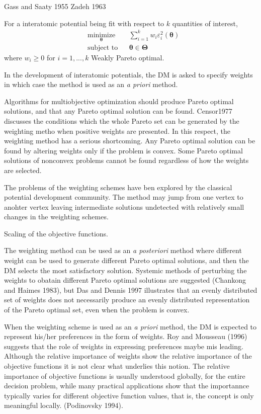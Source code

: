 Gass and Saaty 1955
Zadeh 1963

For a interatomic potential being fit with respect to $k$ quantities of interest,
\begin{equation}
  \begin{aligned}
  & \underset{\bm{\theta}}{\text{minimize}}
        & & \sum_{i=1}^{k}w_{i} \varepsilon_i^2(\bm{\theta}) \\
  & \text{subject to}
        & & \bm{\theta} \in \bm{\Theta}
  \end{aligned}
\end{equation}
where $w_i \geq 0$ for $i=1,...,k$
Weakly Pareto optimal.

  In the development of interatomic potentials, the DM is asked to specify weights in which case the method is used as an \emph{a priori} method.

Algorithms for multiobjective optimization should produce Pareto optimal solutions, and that any Pareto optimal solution can be found.  Censor1977 discusses the conditions which the whole Pareto set can be generated by the weighting metho when positive weights are presented.  In this respect, the weighting method has a serious shortcoming.  Any Pareto optimal solution can be found by altering weights only if the problem is convex.  Some Pareto optimal solutions of nonconvex problems cannot be found regardless of how the weights are selected.

The problems of the weighting schemes have ben explored by the classical potential development community.  The method may jump from one vertex to anohter vertex leaving intermediate solutions undetected with relatively small changes in the weighting schemes.

Scaling of the objective functions.

The weighting method can be used as an \emph{a posteriori} method where different weight can be used to generate different Pareto optimal solutions, and then the DM selects the most satisfactory solution.  Systemic methods of perturbing the weights to obatain different Pareto optimal solutions are suggested (Chankong and Haimes 1983), but Das and Dennis 1997 illustrates that an evenly distributed set of weights does not necessarily produce an evenly distributed representation of the Pareto optimal set, even when the problem is convex.

When the weighting scheme is used as an \emph{a priori} method, the DM is expected to represent his/her preferences in the form of weights.  Roy and Mousseau (1996) suggests that the role of weights in expressing preferences maybe mis leading.  Although the relative importance of weights show the relative importance of the objective functions it is not clear what underlies this notion.  The relative importance of objective functions is usually understood globally, for the entire decision problem, while many practical applications show that the importannce typically varies for different objective function values, that is, the concept is only meaningful locally. (Podinovsky 1994).

